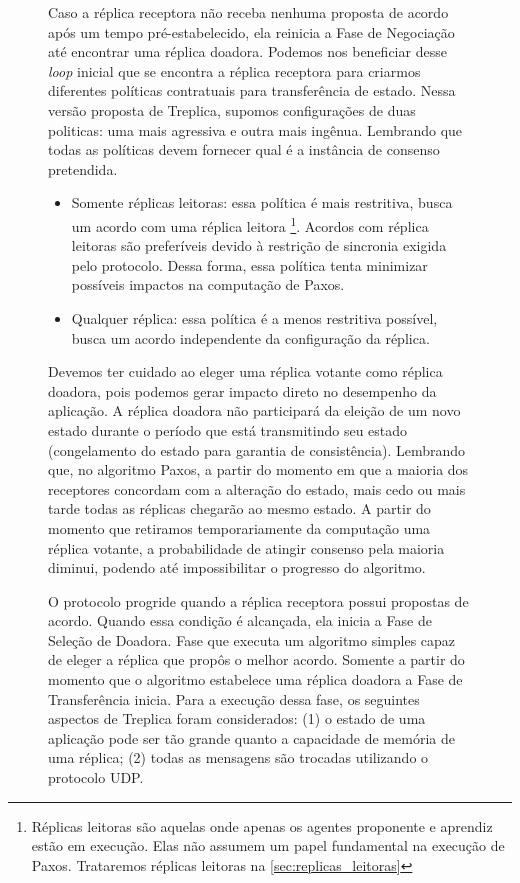 \begin{figure}[ht]
Caso a réplica receptora não receba nenhuma proposta de acordo após um tempo
pré-estabelecido, ela reinicia a Fase de Negociação até encontrar uma réplica doadora.
Podemos nos beneficiar desse \emph{loop} inicial que se encontra a réplica receptora para
criarmos diferentes políticas contratuais para transferência de estado. Nessa versão
proposta de Treplica, supomos configurações de duas politicas: uma mais agressiva e outra
mais ingênua. Lembrando que todas as políticas devem fornecer qual é a instância de
consenso pretendida.

\begin{itemize}
  \item Somente réplicas leitoras: essa política é mais restritiva, busca um acordo com
    uma réplica leitora \footnote{Réplicas leitoras são aquelas onde apenas os agentes
    proponente e aprendiz estão em execução. Elas não assumem um papel fundamental na
    execução de Paxos. Trataremos réplicas leitoras na \autoref{sec:replicas_leitoras}}.
    Acordos com réplica leitoras são preferíveis devido à restrição de sincronia exigida
    pelo protocolo. Dessa forma, essa política tenta minimizar possíveis impactos na
    computação de Paxos.
  \item Qualquer réplica: essa política é a menos restritiva possível, busca um acordo
    independente da configuração da réplica.
\end{itemize}

Devemos ter cuidado ao eleger uma réplica votante como réplica doadora, pois podemos gerar
impacto direto no desempenho da aplicação. A réplica doadora não participará da eleição de
um novo estado durante o período que está transmitindo seu estado (congelamento do estado
para garantia de consistência). Lembrando que, no algoritmo Paxos, a partir do momento em
que a maioria dos receptores concordam com a alteração do estado, mais cedo ou mais tarde
todas as réplicas chegarão ao mesmo estado. A partir do momento que retiramos
temporariamente da computação uma réplica votante, a probabilidade de atingir consenso
pela maioria diminui, podendo até impossibilitar o progresso do algoritmo.

O protocolo progride quando a réplica receptora possui propostas de acordo. Quando essa
condição é alcançada, ela inicia a Fase de Seleção de Doadora. Fase que executa um
algoritmo simples capaz de eleger a réplica que propôs o melhor acordo. Somente a partir
do momento que o algoritmo estabelece uma réplica doadora a Fase de Transferência inicia.
Para a execução dessa fase, os seguintes aspectos de Treplica foram considerados: (1) o
estado de uma aplicação pode ser tão grande quanto a capacidade de memória de uma réplica;
(2) todas as mensagens são trocadas utilizando o protocolo UDP.


\end{figure}

